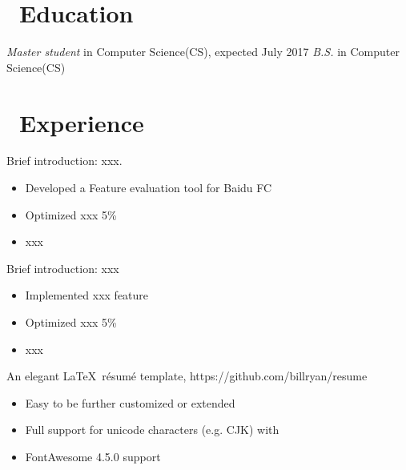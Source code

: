 \documentclass{resume}
\begin{document}



\section{\faGraduationCap\ Education}
\textit{Master student} in Computer Science(CS), expected July 2017
\textit{B.S.} in Computer Science(CS)

\section{\faUsers\ Experience}
Brief introduction: xxx.
\begin{itemize}
  \item Developed a Feature evaluation tool for Baidu FC
  \item Optimized xxx 5\%
  \item xxx
\end{itemize}

Brief introduction: xxx
\begin{itemize}
  \item Implemented xxx feature
  \item Optimized xxx 5\%
  \item xxx
\end{itemize}

An elegant \LaTeX\ résumé template, https://github.com/billryan/resume
\begin{itemize}
  \item Easy to be further customized or extended
  \item Full support for unicode characters (e.g. CJK) with \XeLaTeX\
  \item FontAwesome 4.5.0 support
\end{itemize}
\end{document}
